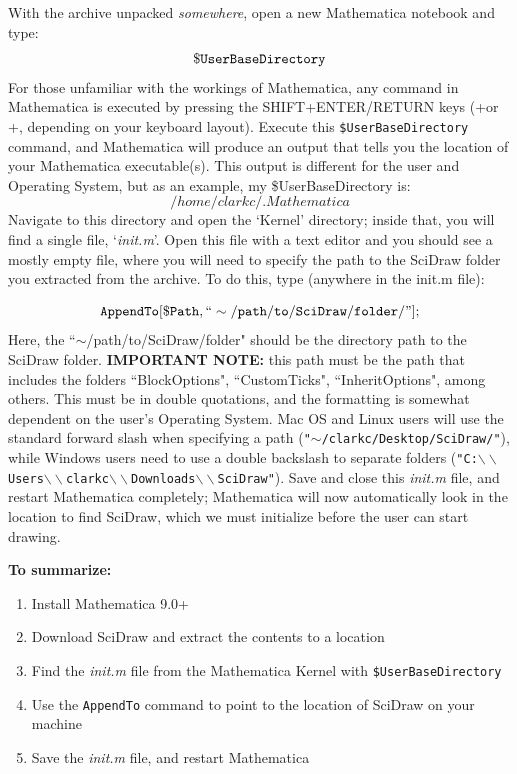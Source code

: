 \documentclass[portrait,10pt]{article}
\begin{document}
With the archive unpacked \textit{somewhere}, open a new Mathematica notebook and type: 
\[
{\tt \$UserBaseDirectory}
\]
For those unfamiliar with the workings of Mathematica, any command in Mathematica is executed by pressing the SHIFT+ENTER/RETURN keys (\Shift+\Enter or \Shift+\Return, depending on your keyboard layout). Execute this {\tt \$UserBaseDirectory} command, and Mathematica will produce an output that tells you the location of your Mathematica executable(s). This output is different for the user and Operating System, but as an example, my \$UserBaseDirectory is:
\[
/home/clarkc/.Mathematica
\]
Navigate to this directory and open the `Kernel' directory; inside that, you will find a single file, `\textit{init.m}'. Open this file with a text editor and you should see a mostly empty file, where you will need to specify the path to the SciDraw folder you extracted from the archive. To do this, type (anywhere in the init.m file):

\[
{\tt AppendTo[\$Path,``\sim/path/to/SciDraw/folder/"];}
\]
Here, the ``$\sim$/path/to/SciDraw/folder" should be the directory path to the SciDraw folder. \textbf{IMPORTANT NOTE:} this path must be the path that includes the folders ``BlockOptions", ``CustomTicks", ``InheritOptions", among others. This must be in double quotations, and the formatting is somewhat dependent on the user's Operating System. Mac OS and Linux users will use the standard forward slash when specifying a path ({\tt "$\sim$/clarkc/Desktop/SciDraw/"}), while Windows users need to use a double backslash to separate folders ({\tt "C:$\backslash\backslash$Users$\backslash\backslash$clarkc$\backslash\backslash$Downloads$\backslash\backslash$SciDraw"}). Save and close this \textit{init.m} file, and restart Mathematica completely; Mathematica will now automatically look in the location to find SciDraw, which we must initialize before the user can start drawing.

\textbf{To summarize:}
\begin{enumerate}
\item Install Mathematica 9.0+
\item Download SciDraw and extract the contents to a location
\item Find the \textit{init.m} file from the Mathematica Kernel with {\tt \$UserBaseDirectory}
\item Use the {\tt AppendTo} command to point to the location of SciDraw on your machine
\item Save the \textit{init.m} file, and restart Mathematica
\end{enumerate}
\end{document}

